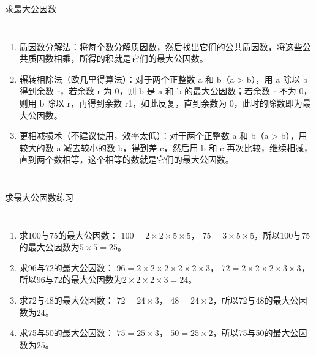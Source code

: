 \documentclass[aspectratio=169]{ctexbeamer} %
\begin{document}
\begin{frame}[t]{求最大公因数}
\begin{columns}
\begin{enumerate}[label={\arabic*.}]
\item \alert{质因数分解法：}将每个数分解质因数，然后找出它们的公共质因数，将这些公共质因数相乘，所得的积就是它们的最大公因数。
\item \alert{辗转相除法（欧几里得算法）：}对于两个正整数 a 和 b（a > b），用 a 除以 b 得到余数 r，若余数 r 为 0，则 b 是 a 和 b 的最大公因数；若余数 r 不为 0，则用 b 除以 r，再得到余数 r1，如此反复，直到余数为 0，此时的除数即为最大公因数。
\item \alert{更相减损术（不建议使用，效率太低）：}对于两个正整数 a 和 b（a > b），用较大的数 a 减去较小的数 b，得到差 c，然后用 b 和 c 再次比较，继续相减，直到两个数相等，这个相等的数就是它们的最大公因数。
\end{enumerate}
\end{columns}
\end{frame}

\begin{frame}[t]{求最大公因数练习}
\begin{columns}
\begin{enumerate}[label={\arabic*.}]
\item 求100与75的最大公因数： $100 = 2 \times 2 \times 5 \times 5$， $75 = 3 \times 5 \times 5$，所以100与75的最大公因数为$5 \times 5 = 25$。
\item 求96与72的最大公因数： $96 = 2 \times 2 \times 2 \times 2 \times 2 \times 3$， $72 = 2 \times 2 \times 2 \times 3 \times 3$，所以96与72的最大公因数为$2 \times 2 \times 2 \times 3  = 24$。
\item 求72与48的最大公因数： $72 = 24 \times 3$， $48 = 24 \times 2$，所以72与48的最大公因数为$24$。
\item 求75与50的最大公因数： $75 = 25 \times 3$， $50 = 25 \times 2$，所以75与50的最大公因数为$25$。
\end{enumerate}
\end{columns}
\end{frame}
\end{document}
